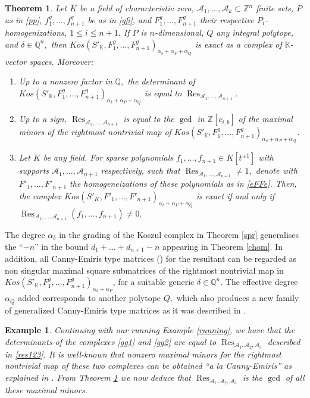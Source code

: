\documentclass[a4paper,11pt]{amsart}
\newcommand{\Res}{\operatorname{Res}}
\newcommand{\K}{\mathbb{K}}
\newcommand{\Q}{\mathbb{Q}}
\newcommand{\Z}{\mathbb{Z}}
\newcommand{\cA}{{\mathcal A}}
\newcounter{thm}
\numberwithin{thm}{section}
\numberwithin{equation}{section}
\theoremstyle{definition}
\newtheorem{example}[thm]{Example}
\theoremstyle{plain}
\newtheorem{theorem}[thm]{Theorem}
\begin{document}
\begin{theorem}\label{csparse}
Let $K$ be a field of characteristic zero,  $\cA_1,\ldots, \cA_{k}\subset\Z^n$ finite sets,  $P$ as in \eqref{pp},  $f^g_1,\ldots, f^g_{n+1}$ be as in \eqref{gfi},  and $F^g_1,\ldots, F^g_{n+1}$ their respective $P_i$-homogenizations, $1\leq i\leq n+1.$ If $P$ is $n$-dimensional, $Q$ any integral polytope, and $\delta\in\Q^n,$ then  $Kos(S'_\K,F^g_1,\ldots, F^g_{n+1})_{\alpha_\delta+\alpha_P+\alpha_Q}$ is exact as a complex of $\K$-vector spaces. Moreover:
\begin{enumerate}
\item Up to a nonzero factor in $\Q,$ the determinant of $Kos(S'_\K,F^g_1,\ldots, F^g_{n+1})_{\alpha_\delta+\alpha_P+\alpha_Q}$ is equal to $\Res_{\cA_1,\ldots, \cA_{n+1}}.$
\item Up to a sign, $\Res_{\cA_1,\ldots, \cA_{n+1}}$ is equal to the $\gcd$ in $\Z[c_{i,b}]$ of the maximal minors of  the rightmost nontrivial map of $Kos(S'_\K,F^g_1,\ldots, F^g_{n+1})_{\alpha_\delta+\alpha_P+\alpha_Q}$.
\item Let $K$ be any field. For sparse polynomials $f_1,\ldots, f_{n+1}\in K[t^{\pm1}]$ with supports  $\cA_1,\ldots, \cA_{n+1}$ respectively, such that $\Res_{\cA_1,\ldots, \cA_{n+1}}\neq1,$ denote with $F'_1,\ldots, F'_{n+1}$ the homogeneizations of these polynomials as in \eqref{eFFe}.
 Then,   the complex $Kos(S'_K,F'_1,\ldots, F'_{n+1})_{\alpha_\delta+\alpha_P+\alpha_Q}$ is exact if and only if $\Res_{\cA_1,\ldots, \cA_{n+1}}(f_1,\ldots, f_{n+1})\neq0.$
\end{enumerate}
\end{theorem}

The degree $\alpha_\delta$ in the grading of the Koszul complex in Theorem \ref{spr} generalises the ``$-n$'' in the bound $d_1+\ldots+d_{n+1}-n$ appearing in Theorem \ref{chom}. In addition, all Canny-Emiris type matrices (\cite{CE93,DJS23}) for the resultant can be regarded as non singular maximal square submatrices of the rightmost nontrivial map in $Kos(S'_\K,F^g_1,\ldots, F^g_{n+1})_{\alpha_\delta+\alpha_P}$, for a suitable generic  $\delta\in\Q^n.$  The effective degree $\alpha_Q$ added corresponds to another polytope $Q,$  which also produces a new family of generalized Canny-Emiris type matrices as it was described in \cite[Remark $4.28$]{DJS23}.

\begin{example}
{\em Continuing with our running Example \ref{running}, we have that the determinants of the complexes \eqref{gg1} and \eqref{gg2} are equal to $\Res_{\cA_1,\cA_2,\cA_3}$ described in \eqref{res123}. It is well-known  that nonzero maximal minors for the rightmost nontrivial map of these two complexes can be obtained ``a la Canny-Emiris'' as explained in \cite{CE93, DJS23}. From Theorem \ref{csparse} we now deduce that $\Res_{\cA_1,\cA_2,\cA_3}$ is the $\gcd$ of all these maximal minors. 
}
\end{example}
\end{document}
